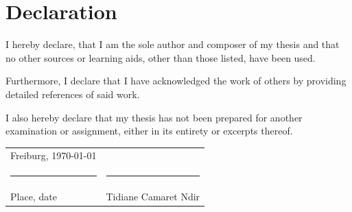 \begingroup
\setlength{\parindent}{0pt}

\section*{Declaration}

\bigskip
\bigskip
\bigskip

I hereby declare, that I am the sole author and composer of my thesis and
that no other sources or learning aids, other than those listed, have been used.

Furthermore, I declare that I have acknowledged the work of others
by providing detailed references of said work.

I also hereby declare that my thesis has not been prepared
for another examination or assignment, either in its entirety or excerpts thereof.

\bigskip
\bigskip
\bigskip
\bigskip
\bigskip
\bigskip

\begin{tabular}{p{} l}
    Freiburg, \today             &                              \\
    \rule{\textwidth*2/5}{0.4pt} & \rule{\textwidth*2/5}{0.4pt} \\
    Place, date                  & Tidiane Camaret Ndir
\end{tabular}

\endgroup
